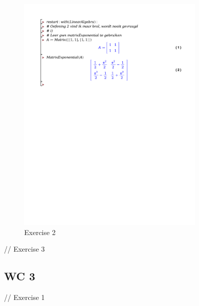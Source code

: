 \documentclass[a4paper]{article}
\begin{document}
\begin{figure}[H]
	\centering
	\includegraphics[width=0.8\textwidth]{exercises/bord_3_ex_2.pdf}
	\caption{Exercise 2}
	\label{fig:bord_3_ex_2}
\end{figure}

// Exercise 3


\subsection*{WC 3}

// Exercise 1

\end{document}
